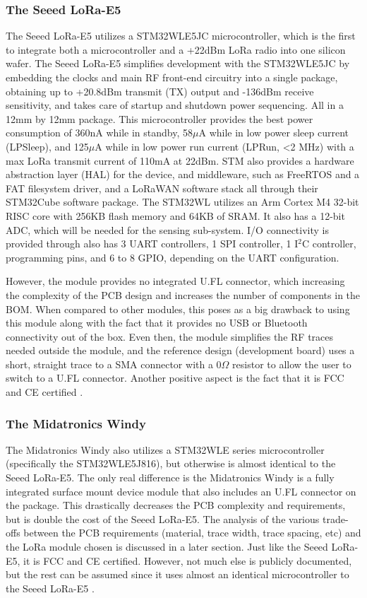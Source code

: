 \subsubsection{The Seeed LoRa-E5}
The Seeed LoRa-E5 utilizes a STM32WLE5JC microcontroller, which is the first to
integrate both a microcontroller and a +22dBm LoRa radio into one silicon wafer.
The Seeed LoRa-E5 simplifies development with the STM32WLE5JC by embedding the
clocks and main RF front-end circuitry into a single package, obtaining up to
+20.8dBm transmit (TX) output and -136dBm receive sensitivity, and takes care
of startup and shutdown power sequencing. All in a 12mm by 12mm package. This
microcontroller provides the best power consumption of 360nA while in standby,
58$\mu$A while in low power sleep current (LPSleep), and 125$\mu$A while in low
power run current (LPRun, <2 MHz) with a max LoRa transmit current of 110mA at
22dBm. STM also provides a hardware abstraction layer (HAL) for the device, and
middleware, such as FreeRTOS and a FAT filesystem driver, and a LoRaWAN
software stack all through their STM32Cube software package. The STM32WL
utilizes an Arm Cortex M4 32-bit RISC core with 256KB flash memory and 64KB of
SRAM. It also has a 12-bit ADC, which will be needed for the sensing
sub-system.  I/O connectivity is provided through also has 3 UART controllers,
1 SPI controller, 1 I$^2$C controller, programming pins, and 6 to 8 GPIO,
depending on the UART configuration.

However, the module provides no integrated U.FL connector, which increasing the
complexity of the PCB design and increases the number of components in the BOM.
When compared to other modules, this poses as a big drawback to using this
module along with the fact that it provides no USB or Bluetooth connectivity out
of the box. Even then, the module simplifies the RF traces needed outside the
module, and the reference design (development board) uses a short, straight
trace to a SMA connector with a 0$\Omega$ resistor to allow the user to switch
to a U.FL connector.  Another positive aspect is the fact that it is FCC and CE
certified \cite{ds-stm32wle5j8}\cite{ds-lora-e5}.


\subsubsection{The Midatronics Windy} 
The Midatronics Windy also utilizes a STM32WLE series microcontroller
(specifically the STM32WLE5J816), but otherwise is almost identical to the Seeed
LoRa-E5. The only real difference is the Midatronics Windy is a fully integrated
surface mount device module that also includes an U.FL connector on the package.
This drastically decreases the PCB complexity and requirements, but is double
the cost of the Seeed LoRa-E5. The analysis of the various trade-offs between the
PCB requirements (material, trace width, trace spacing, etc) and the LoRa module
chosen is discussed in a later section. Just like the Seeed LoRa-E5, it is FCC
and CE certified. However, not much else is publicly documented, but the rest
can be assumed since it uses almost an identical microcontroller to the Seeed
LoRa-E5 \cite{ds-midatronics-windy}\cite{ds-midatronics-mkr-windy}\cite{ds-stm32wle5j8}.

